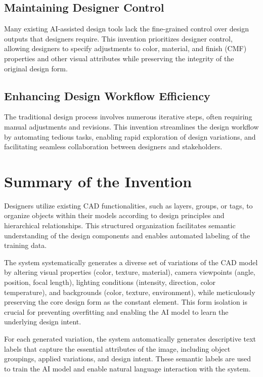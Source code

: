\documentclass{article}
\begin{document}
\subsection{Maintaining Designer Control}
Many existing AI-assisted design tools lack the fine-grained control over design outputs that designers require. This invention prioritizes designer control, allowing designers to specify adjustments to color, material, and finish (CMF) properties and other visual attributes while preserving the integrity of the original design form.

\subsection{Enhancing Design Workflow Efficiency}
The traditional design process involves numerous iterative steps, often requiring manual adjustments and revisions. This invention streamlines the design workflow by automating tedious tasks, enabling rapid exploration of design variations, and facilitating seamless collaboration between designers and stakeholders.

\section{Summary of the Invention}

Designers utilize existing CAD functionalities, such as layers, groups, or tags, to organize objects within their models according to design principles and hierarchical relationships. This structured organization facilitates semantic understanding of the design components and enables automated labeling of the training data.

The system systematically generates a diverse set of variations of the CAD model by altering visual properties (color, texture, material), camera viewpoints (angle, position, focal length), lighting conditions (intensity, direction, color temperature), and backgrounds (color, texture, environment), while meticulously preserving the core design form as the constant element. This form isolation is crucial for preventing overfitting and enabling the AI model to learn the underlying design intent.

For each generated variation, the system automatically generates descriptive text labels that capture the essential attributes of the image, including object groupings, applied variations, and design intent. These semantic labels are used to train the AI model and enable natural language interaction with the system.
\end{document}
